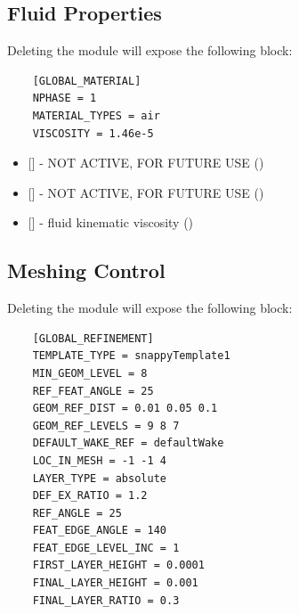 \subsection{Fluid Properties}
Deleting the module  will expose the following block:
\begin{lstlisting}
    [GLOBAL_MATERIAL]
    NPHASE = 1
    MATERIAL_TYPES = air
    VISCOSITY = 1.46e-5
\end{lstlisting}

\begin{itemize}
    \item {} [] - NOT ACTIVE, FOR FUTURE USE ()
    
    \item {} [] - NOT ACTIVE, FOR FUTURE USE ()
    
    \item {} [] - fluid kinematic viscosity ()
\end{itemize}


\subsection{Meshing Control}
Deleting the module  will expose the following block:
\begin{lstlisting}
    [GLOBAL_REFINEMENT]
    TEMPLATE_TYPE = snappyTemplate1
    MIN_GEOM_LEVEL = 8
    REF_FEAT_ANGLE = 25
    GEOM_REF_DIST = 0.01 0.05 0.1
    GEOM_REF_LEVELS = 9 8 7
    DEFAULT_WAKE_REF = defaultWake
    LOC_IN_MESH = -1 -1 4
    LAYER_TYPE = absolute
    DEF_EX_RATIO = 1.2
    REF_ANGLE = 25
    FEAT_EDGE_ANGLE = 140
    FEAT_EDGE_LEVEL_INC = 1
    FIRST_LAYER_HEIGHT = 0.0001
    FINAL_LAYER_HEIGHT = 0.001
    FINAL_LAYER_RATIO = 0.3
\end{lstlisting}

